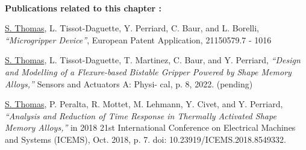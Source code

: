 %
\vspace*{\fill}
\noindent\hrulefill \\
\textbf{\large Publications related to this chapter :}

\underline{S. Thomas}, L. Tissot-Daguette, Y. Perriard, C. Baur, and L. Borelli, \textit{“Microgripper Device”}, European Patent Application, 21150579.7 - 1016

\underline{S. Thomas}, L. Tissot-Daguette, T. Martinez, C. Baur, and Y. Perriard, \textit{“Design and Modelling of a Flexure-based Bistable Gripper Powered by Shape Memory Alloys,”} Sensors and Actuators A: Physi- cal, p. 8, 2022. (pending)

\underline{S. Thomas}, P. Peralta, R. Mottet, M. Lehmann, Y. Civet, and Y. Perriard, \textit{“Analysis and Reduction of Time Response in Thermally Activated Shape Memory Alloys,”} in 2018 21st International Conference on Electrical Machines and Systems (ICEMS), Oct. 2018, p. 7. doi: 10.23919/ICEMS.2018.8549332.
